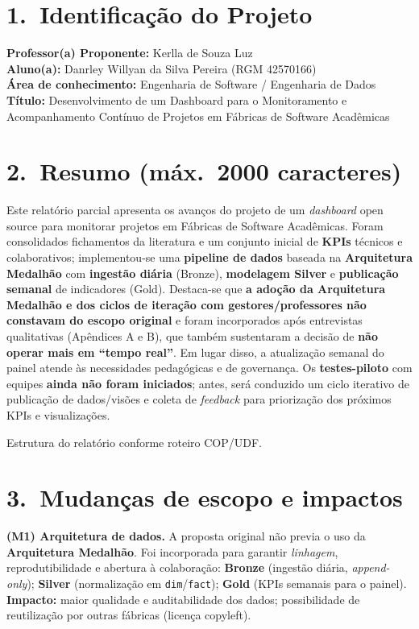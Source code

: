 \documentclass[
	12pt,
	openright,
	oneside,
	a4paper,
	brazil
]{abntex2}
\begin{document}
\frenchspacing

\textual


\section*{1.\ Identificação do Projeto}
\textbf{Professor(a) Proponente:} Kerlla de Souza Luz \\
\textbf{Aluno(a):} Danrley Willyan da Silva Pereira (RGM 42570166) \\
\textbf{Área de conhecimento:} Engenharia de Software / Engenharia de Dados \\
\textbf{Título:} Desenvolvimento de um Dashboard para o Monitoramento e Acompanhamento Contínuo de Projetos em Fábricas de Software Acadêmicas

\section*{2.\ Resumo (máx.\ 2000 caracteres)}
Este relatório parcial apresenta os avanços do projeto de um \textit{dashboard} open source para monitorar projetos em Fábricas de Software Acadêmicas. Foram consolidados fichamentos da literatura e um conjunto inicial de \textbf{KPIs} técnicos e colaborativos; implementou-se uma \textbf{pipeline de dados} baseada na \textbf{Arquitetura Medalhão} com \textbf{ingestão diária} (Bronze), \textbf{modelagem Silver} e \textbf{publicação semanal} de indicadores (Gold). Destaca-se que \textbf{a adoção da Arquitetura Medalhão e dos ciclos de iteração com gestores/professores não constavam do escopo original} e foram incorporados após entrevistas qualitativas (Apêndices A e B), que também sustentaram a decisão de \textbf{não operar mais em ``tempo real''}. Em lugar disso, a atualização semanal do painel atende às necessidades pedagógicas e de governança. Os \textbf{testes-piloto} com equipes \textbf{ainda não foram iniciados}; antes, será conduzido um ciclo iterativo de publicação de dados/visões e coleta de \textit{feedback} para priorização dos próximos KPIs e visualizações.

\smallskip
{\footnotesize Estrutura do relatório conforme roteiro COP/UDF.}

\section*{3.\ Mudanças de escopo e impactos}
\textbf{(M1) Arquitetura de dados.} A proposta original não previa o uso da \textbf{Arquitetura Medalhão}. Foi incorporada para garantir \textit{linhagem}, reprodutibilidade e abertura à colaboração: \textbf{Bronze} (ingestão diária, \emph{append-only}); \textbf{Silver} (normalização em \texttt{dim}/\texttt{fact}); \textbf{Gold} (KPIs semanais para o painel). \\
\textbf{Impacto:} maior qualidade e auditabilidade dos dados; possibilidade de reutilização por outras fábricas (licença copyleft). 
\end{document}
